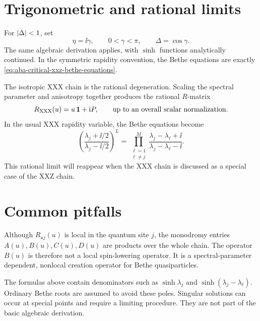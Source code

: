 \section{Trigonometric and rational limits}
\label{sec:aba-trigonometric-rational-limits}

For $\left|\Delta\right|<1$, set
\begin{equation}
\label{eq:aba-eta-to-gamma}
    \eta=\ii\gamma,
    \qquad
    0<\gamma<\pi,
    \qquad
    \Delta=\cos\gamma .
\end{equation}
The same algebraic derivation applies, with $\sinh$ functions analytically
continued.  In the symmetric rapidity convention, the Bethe equations are exactly
\cref{eq:aba-critical-xxz-bethe-equations}.

The isotropic XXX chain is the rational degeneration.  Scaling the spectral
parameter and anisotropy together produces the rational $R$-matrix
\begin{equation}
\label{eq:aba-rational-R-schematic}
    R_{\rm XXX}(u)=u\,\mathbf{1}+\mathrm{i} P,
    \qquad
    \text{up to an overall scalar normalization.}
\end{equation}
In the usual XXX rapidity variable, the Bethe equations become
\begin{equation}
\label{eq:aba-xxx-bethe-equations}
    \left(
    \frac{\lambda_j+\ii/2}{\lambda_j-\ii/2}
    \right)^L
    =
    \prod_{\substack{\ell=1\\ \ell\neq j}}^{M}
    \frac{\lambda_j-\lambda_\ell+\ii}
         {\lambda_j-\lambda_\ell-\ii} .
\end{equation}
This rational limit will reappear when the XXX chain is discussed as a special
case of the XXZ chain.

\section{Common pitfalls}
\label{sec:aba-common-pitfalls}

\begin{remark}
Although $R_{aj}(u)$ is local in the quantum site $j$, the monodromy entries
$A(u),B(u),C(u),D(u)$ are products over the whole chain.  The operator $B(u)$ is
therefore not a local spin-lowering operator.  It is a spectral-parameter
dependent, nonlocal creation operator for Bethe quasiparticles.
\end{remark}

\begin{remark}
The formulas above contain denominators such as $\sinh\lambda_j$ and
$\sinh(\lambda_j-\lambda_\ell)$.  Ordinary Bethe roots are assumed to avoid these
poles.  Singular solutions can occur at special points and require a limiting
procedure.  They are not part of the basic algebraic derivation.
\end{remark}

